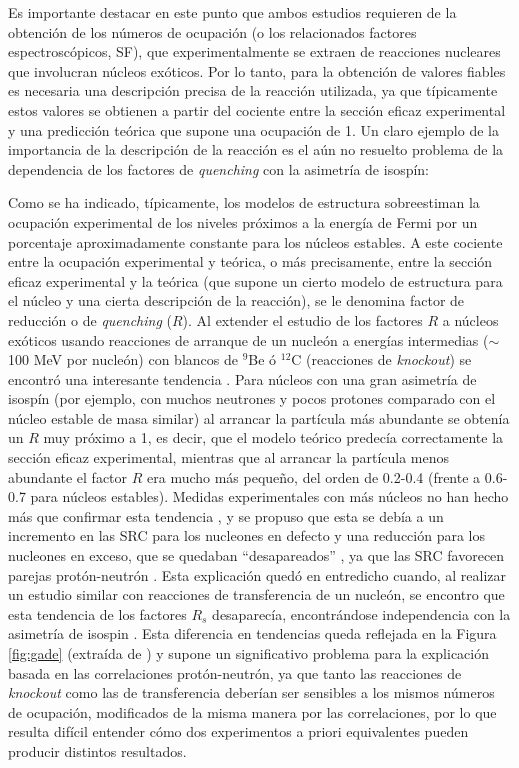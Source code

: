 \documentclass[a4paper,12pt,twoside]{article}
\begin{document}
Es importante destacar en este punto que ambos estudios requieren de la obtención de los números de ocupación (o los relacionados factores espectroscópicos, SF), que experimentalmente se extraen de reacciones nucleares que involucran núcleos exóticos. Por lo tanto, para la obtención de valores fiables es necesaria una descripción precisa de la reacción utilizada, ya que típicamente estos valores se obtienen a partir del cociente entre la sección eficaz experimental y una predicción teórica que supone una ocupación de 1. Un claro ejemplo de la importancia de la descripción de la reacción es el aún no resuelto problema de la dependencia de los factores de \textit{quenching} con la asimetría de isospín:

Como se ha indicado, típicamente, los modelos de estructura sobreestiman la ocupación experimental de los niveles próximos a la energía de Fermi por un porcentaje aproximadamente constante para los núcleos estables. A este cociente entre la ocupación experimental y teórica, o más precisamente, entre la sección eficaz experimental y la teórica (que supone un cierto modelo de estructura para el núcleo y una cierta descripción de la reacción), se le denomina factor de reducción o de \textit{quenching} ($R$). Al extender el estudio de los factores $R$ a núcleos exóticos usando reacciones de arranque de un nucleón a energías intermedias ($\sim$100 MeV por nucleón) con blancos de $^9$Be ó $^{12}$C (reacciones de \textit{knockout}) se encontró una interesante tendencia \cite{Gad08}. Para núcleos con una gran asimetría de isospín (por ejemplo, con muchos neutrones y pocos protones comparado con el núcleo estable de masa similar) al arrancar la partícula más abundante se obtenía un $R$ muy próximo a 1, es decir, que el modelo teórico predecía correctamente la sección eficaz experimental, mientras que al arrancar la partícula menos abundante el factor $R$ era mucho más pequeño, del orden de 0.2-0.4 (frente a 0.6-0.7 para núcleos estables). Medidas experimentales con más núcleos no han hecho más que confirmar esta tendencia \cite{Tos14,Tos21}, y se propuso que esta se debía a un incremento en las SRC para los nucleones en defecto y una reducción para los nucleones en exceso, que se quedaban ``desapareados'' \cite{Jen11}, ya que las SRC favorecen parejas protón-neutrón \cite{Pia06,Sub08}. Esta explicación quedó en entredicho cuando, al realizar un estudio similar con reacciones de transferencia de un nucleón, se encontro que esta tendencia de los factores $R_s$ desaparecía, encontrándose independencia con la asimetría de isospin \cite{Fla13,Kay13}. Esta diferencia en tendencias queda reflejada en la Figura \ref{fig:gade} (extraída de \cite{Kay22}) y supone un significativo problema para la explicación basada en las correlaciones protón-neutrón, ya que tanto las reacciones de \textit{knockout} como las de transferencia deberían ser sensibles a los mismos números de ocupación, modificados de la misma manera por las correlaciones, por lo que resulta difícil entender cómo dos experimentos a priori equivalentes pueden producir distintos resultados. 
\end{document}
